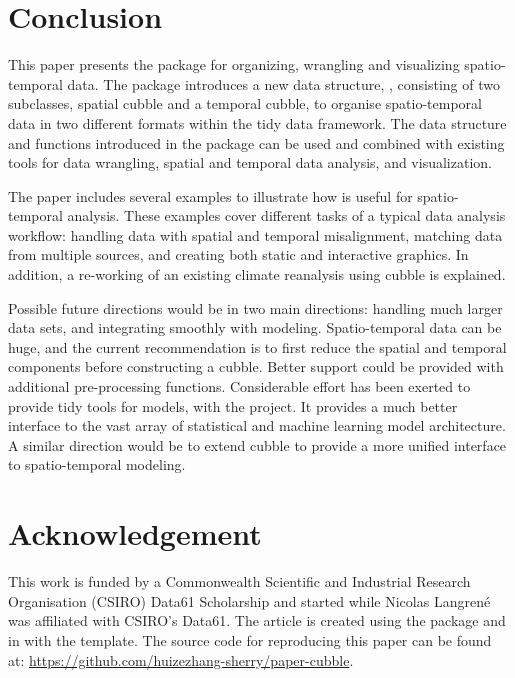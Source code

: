 \documentclass[
  shortnames]{jss}
\begin{document}
\hypertarget{conclude}{%
\section{Conclusion}\label{conclude}}

This paper presents the  package  for organizing, wrangling and visualizing spatio-temporal data. The package introduces a new data structure, , consisting of two subclasses, spatial cubble and a temporal cubble, to organise spatio-temporal data in two different formats within the tidy data framework. The data structure and functions introduced in the package can be used and combined with existing tools for data wrangling, spatial and temporal data analysis, and visualization.

The paper includes several examples to illustrate how  is useful for spatio-temporal analysis. These examples cover different tasks of a typical data analysis workflow: handling data with spatial and temporal misalignment, matching data from multiple sources, and creating both static and interactive graphics. In addition, a re-working of an existing climate reanalysis using cubble is explained.

Possible future directions would be in two main directions: handling much larger data sets, and integrating smoothly with modeling. Spatio-temporal data can be huge, and the current recommendation is to first reduce the spatial and temporal components before constructing a cubble. Better support could be provided with additional pre-processing functions. Considerable effort has been exerted to provide tidy tools for models, with the  project. It provides a much better interface to the vast array of statistical and machine learning model architecture. A similar direction would be to extend cubble to provide a more unified interface to spatio-temporal modeling.

\hypertarget{acknowledgement}{%
\section{Acknowledgement}\label{acknowledgement}}

This work is funded by a Commonwealth Scientific and Industrial Research Organisation (CSIRO) Data61 Scholarship and started while Nicolas Langrené was affiliated with CSIRO's Data61. The article is created using the package  \citep{knitr} and  \citep{rmarkdown} in  with the  template. The source code for reproducing this paper can be found at: \url{https://github.com/huizezhang-sherry/paper-cubble}.


\end{document}
